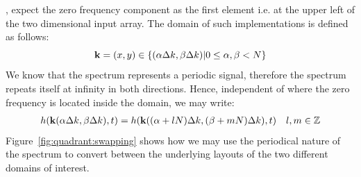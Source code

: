 \citet{FFTW05}, expect the zero frequency component as the first element i.e. at the
upper left of the two dimensional input array.
The \wavevector domain of such implementations is defined as follows:
\begin{equation*}
\mathbf{k} = (x,y)\in\{(\alpha\Delta k,\beta\Delta k)|
0\leq\alpha,\beta<N\}
\end{equation*}
%
We know that the spectrum represents a periodic signal, therefore the spectrum
repeats itself at infinity in both directions. Hence, independent of where the
zero frequency is located inside the \wavevector domain, we may write:
%
\begin{align*}
 h(\mathbf{k}(\alpha\Delta k,\beta\Delta k),t) = h(\mathbf{k}((\alpha + lN)\Delta k, (\beta +mN)\Delta k),t) && l,m \in \mathbb{Z}
\end{align*}
%
Figure~\ref{fig:quadrant:swapping} shows how we may use the periodical nature
of the spectrum to convert between the underlying layouts of the two different
\wavevector domains of interest.


